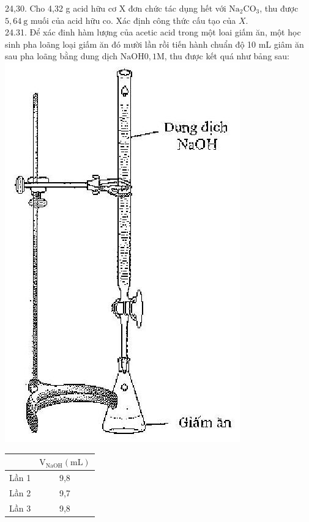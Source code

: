 \documentclass[10pt]{article}
\begin{document}
24,30. Cho 4,32 g acid hữu cơ X đơn chức tác dụng hết với $\mathrm{Na}_{2} \mathrm{CO}_{3}$, thu được $5,64 \mathrm{~g}$ muối của acid hữu co. Xác định công thức cấu tạo của $X$.\\
24.31. Để xác đinh hàm lượng của acetic acid trong một loai giấm ăn, một học sinh pha loãng loại giấm ăn đó mười lần rồi tiến hành chuẩn độ 10 mL giâm ăn sau pha loãng bằng dung dịch $\mathrm{NaOH} 0,1 \mathrm{M}$, thu được kết quá như bảng sau:\\
\includegraphics[max width=\textwidth, center]{2025_10_23_fa9073eecee116ad8cf2g-87}

\begin{center}
\begin{tabular}{|c|c|}
\hline
 & $\mathrm{V}_{\mathrm{NaOH}}(\mathrm{mL})$ \\
\hline
Lần 1 & 9,8 \\
\hline
Lần 2 & 9,7 \\
\hline
Lần 3 & 9,8 \\
\hline
\end{tabular}
\end{center}
\end{document}

